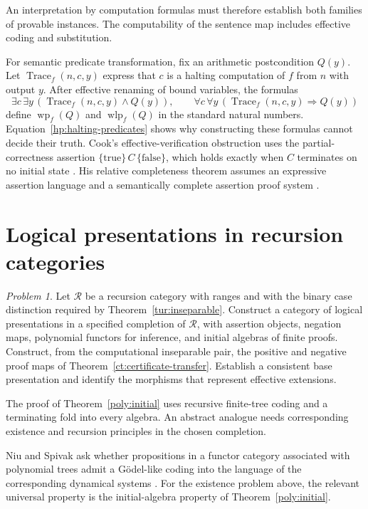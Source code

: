\documentclass[11pt]{article}
\theoremstyle{definition}
\theoremstyle{remark}
\newtheorem{problem}[theorem]{Problem}
\newcommand{\R}{\mathscr R}
\begin{document}
An interpretation by computation formulas must therefore establish both
families of provable instances. The computability of the sentence map
includes effective coding and substitution.

For semantic predicate transformation, fix an arithmetic postcondition
$Q(y)$. Let $\operatorname{Trace}_f(n,c,y)$ express that $c$ is a halting
computation of $f$ from $n$ with output $y$. After effective
renaming of bound variables, the formulas
\[
 \exists c\,\exists y\,
   (\operatorname{Trace}_f(n,c,y)\land Q(y)),
 \qquad
 \forall c\,\forall y\,
   (\operatorname{Trace}_f(n,c,y)\Rightarrow Q(y))
\]
define $\operatorname{wp}_f(Q)$ and $\operatorname{wlp}_f(Q)$ in the
standard natural numbers. Equation~\eqref{hp:halting-predicates} shows
why constructing these formulas cannot decide their truth.
Cook's effective-verification obstruction uses the partial-correctness
assertion $\{\mathrm{true}\}\,C\,\{\mathrm{false}\}$, which holds
exactly when $C$ terminates on no initial state
\cite[\S6, p.~85]{Cook}. His relative completeness theorem assumes an
expressive assertion language and a semantically complete assertion
proof system \cite[\S6, p.~86]{Cook}.

\section{Logical presentations in recursion categories}\label{prob:section}

\begin{problem}\label{prob:intrinsic}
Let $\R$ be a recursion category with ranges and with the binary case
distinction required by Theorem~\ref{tur:inseparable}. Construct a
category of logical presentations in a specified completion of $\R$,
with assertion objects, negation maps, polynomial functors for inference,
and initial algebras of finite proofs. Construct, from the computational
inseparable pair, the positive and negative proof maps of
Theorem~\ref{ct:certificate-transfer}. Establish a consistent base
presentation and identify the morphisms that represent effective
extensions.
\end{problem}

The proof of Theorem~\ref{poly:initial} uses recursive
finite-tree coding and a terminating fold into every algebra. An abstract
analogue needs corresponding existence and recursion principles in the
chosen completion.

Niu and Spivak ask whether propositions in a functor category associated
with polynomial trees admit a G\"odel-like coding into the language of
the corresponding dynamical systems
\cite[Chapter~9, Question~14, p.~350]{NS2024}.
For the existence problem above, the relevant universal property is
the initial-algebra property of Theorem~\ref{poly:initial}.
\end{document}
